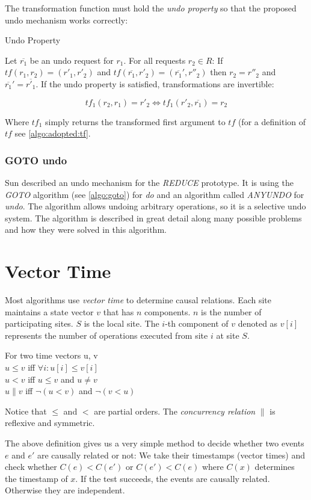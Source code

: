 The transformation function must hold the \emph{undo property} so that the proposed undo mechanism works correctly:

\begin{defn}
Undo Property
\end{defn}

Let $\overline{r_{1}}$ be an undo request for $r_{1}$. For all requests $r_{2} \in R$: If $tf(r_1,r_2) = (r'_1,r'_2)$ and $tf(\overline{r_1},r'_2) = (\overline{r_1}',r''_2)$ then $r_2 = r''_2$ and $\overline{r_1}' = \overline{r'_1}$. If the undo property is satisfied, transformations are invertible:

$$ tf_1(r_2,r_1) = r'_2 \Longleftrightarrow tf_1(r'_2,\overline{r_1}) = r_2 $$

Where $tf_1$ simply returns the transformed first argument to $tf$ (for a definition of $tf$ see \ref{algo:adopted:tf}.


\subsubsection{GOTO undo}
Sun \cite{sun02b} described an undo mechanism for the \emph{REDUCE} prototype. It is using the \emph{GOTO} algorithm (see \ref{algo:goto}) for \emph{do} and an algorithm called \emph{ANYUNDO} for \emph{undo}. The algorithm allows undoing arbitrary operations, so it is a selective undo system. The algorithm is described in great detail along many possible problems and how they were solved in this algorithm.



\section{Vector Time}
\label{sect:vectortime}

Most algorithms use \emph{vector time} to determine causal relations. Each site maintains a state vector $v$ that has $n$ components. $n$ is the number of participating sites. $S$ is the local site. The $i$-th component of $v$ denoted as $v[i]$ represents the number of operations executed from site $i$ at site $S$. 

\begin{defn}
  For two time vectors u, v \\
  $u \leq v$ iff $\forall i : u[i] \leq v[i]$ \\
  $u < v$ iff $u \leq v$ and $u \not= v$ \\
  $u \parallel v$ iff $\neg(u < v)$ and $\neg(v < u)$
\end{defn}

Notice that $\leq$ and $<$ are partial orders. The \emph{concurrency relation} $\parallel$ is reflexive and symmetric.

The above definition gives us a very simple method to decide whether two events $e$ and $e'$ are causally related or not: We take their timestamps (vector times) and check whether $C(e) < C(e')$ or $C(e') < C(e)$ where $C(x)$ determines the timestamp of $x$. If the test succeeds, the events are causally related. Otherwise they are independent.

